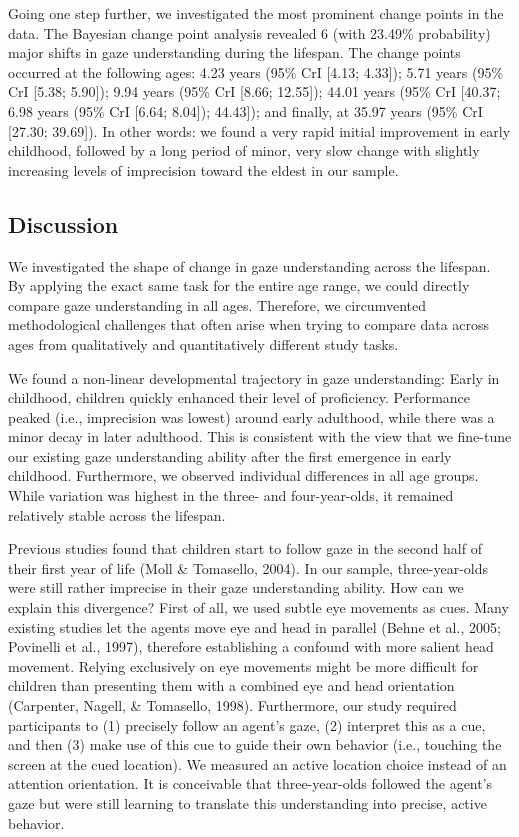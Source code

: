 \documentclass[
  man,mask,floatsintext]{apa6}
\begin{document}
Going one step further, we investigated the most prominent change points in the data. The Bayesian change point analysis revealed 6 (with 23.49\% probability) major shifts in gaze understanding during the lifespan. The change points occurred at the following ages: 4.23 years (95\% CrI {[}4.13; 4.33{]}); 5.71 years (95\% CrI {[}5.38; 5.90{]}); 9.94 years (95\% CrI {[}8.66; 12.55{]}); 44.01 years (95\% CrI {[}40.37; 6.98 years (95\% CrI {[}6.64; 8.04{]}); 44.43{]}); and finally, at 35.97 years (95\% CrI {[}27.30; 39.69{]}). In other words: we found a very rapid initial improvement in early childhood, followed by a long period of minor, very slow change with slightly increasing levels of imprecision toward the eldest in our sample.

\hypertarget{discussion}{%
\subsection{Discussion}\label{discussion}}

We investigated the shape of change in gaze understanding across the lifespan. By applying the exact same task for the entire age range, we could directly compare gaze understanding in all ages. Therefore, we circumvented methodological challenges that often arise when trying to compare data across ages from qualitatively and quantitatively different study tasks.

We found a non-linear developmental trajectory in gaze understanding: Early in childhood, children quickly enhanced their level of proficiency. Performance peaked (i.e., imprecision was lowest) around early adulthood, while there was a minor decay in later adulthood. This is consistent with the view that we fine-tune our existing gaze understanding ability after the first emergence in early childhood. Furthermore, we observed individual differences in all age groups. While variation was highest in the three- and four-year-olds, it remained relatively stable across the lifespan.

Previous studies found that children start to follow gaze in the second half of their first year of life (Moll \& Tomasello, 2004). In our sample, three-year-olds were still rather imprecise in their gaze understanding ability. How can we explain this divergence? First of all, we used subtle eye movements as cues. Many existing studies let the agents move eye and head in parallel (Behne et al., 2005; Povinelli et al., 1997), therefore establishing a confound with more salient head movement. Relying exclusively on eye movements might be more difficult for children than presenting them with a combined eye and head orientation (Carpenter, Nagell, \& Tomasello, 1998). Furthermore, our study required participants to (1) precisely follow an agent's gaze, (2) interpret this as a cue, and then (3) make use of this cue to guide their own behavior (i.e., touching the screen at the cued location). We measured an active location choice instead of an attention orientation. It is conceivable that three-year-olds followed the agent's gaze but were still learning to translate this understanding into precise, active behavior.
\end{document}
